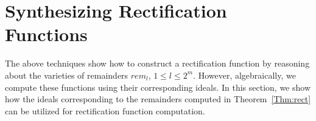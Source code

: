 \section{Synthesizing Rectification Functions}\label{comp:synth}

The above techniques show how to construct a rectification function
by reasoning about the varieties of remainders $rem_l$, $1\leq l \leq 2^m$.  
However, algebraically, we compute these functions using their corresponding ideals.
In this section, we show how the ideals corresponding to the remainders computed in 
Theorem~\ref{Thm:rect} can be utilized for rectification function computation.




